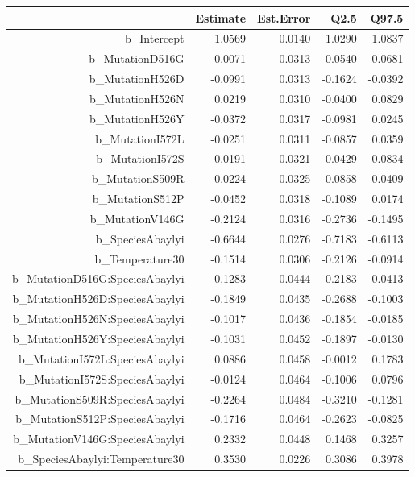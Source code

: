 \begin{table}[ht]
\centering
\begingroup\footnotesize
\begin{tabular}{rrrrr}
  \hline
 & Estimate & Est.Error & Q2.5 & Q97.5 \\ 
  \hline
b\_Intercept & 1.0569 & 0.0140 & 1.0290 & 1.0837 \\ 
  b\_MutationD516G & 0.0071 & 0.0313 & -0.0540 & 0.0681 \\ 
  b\_MutationH526D & -0.0991 & 0.0313 & -0.1624 & -0.0392 \\ 
  b\_MutationH526N & 0.0219 & 0.0310 & -0.0400 & 0.0829 \\ 
  b\_MutationH526Y & -0.0372 & 0.0317 & -0.0981 & 0.0245 \\ 
  b\_MutationI572L & -0.0251 & 0.0311 & -0.0857 & 0.0359 \\ 
  b\_MutationI572S & 0.0191 & 0.0321 & -0.0429 & 0.0834 \\ 
  b\_MutationS509R & -0.0224 & 0.0325 & -0.0858 & 0.0409 \\ 
  b\_MutationS512P & -0.0452 & 0.0318 & -0.1089 & 0.0174 \\ 
  b\_MutationV146G & -0.2124 & 0.0316 & -0.2736 & -0.1495 \\ 
  b\_SpeciesAbaylyi & -0.6644 & 0.0276 & -0.7183 & -0.6113 \\ 
  b\_Temperature30 & -0.1514 & 0.0306 & -0.2126 & -0.0914 \\ 
  b\_MutationD516G:SpeciesAbaylyi & -0.1283 & 0.0444 & -0.2183 & -0.0413 \\ 
  b\_MutationH526D:SpeciesAbaylyi & -0.1849 & 0.0435 & -0.2688 & -0.1003 \\ 
  b\_MutationH526N:SpeciesAbaylyi & -0.1017 & 0.0436 & -0.1854 & -0.0185 \\ 
  b\_MutationH526Y:SpeciesAbaylyi & -0.1031 & 0.0452 & -0.1897 & -0.0130 \\ 
  b\_MutationI572L:SpeciesAbaylyi & 0.0886 & 0.0458 & -0.0012 & 0.1783 \\ 
  b\_MutationI572S:SpeciesAbaylyi & -0.0124 & 0.0464 & -0.1006 & 0.0796 \\ 
  b\_MutationS509R:SpeciesAbaylyi & -0.2264 & 0.0484 & -0.3210 & -0.1281 \\ 
  b\_MutationS512P:SpeciesAbaylyi & -0.1716 & 0.0464 & -0.2623 & -0.0825 \\ 
  b\_MutationV146G:SpeciesAbaylyi & 0.2332 & 0.0448 & 0.1468 & 0.3257 \\ 
  b\_SpeciesAbaylyi:Temperature30 & 0.3530 & 0.0226 & 0.3086 & 0.3978 \\ 

\end{tabular}
\end{table}
